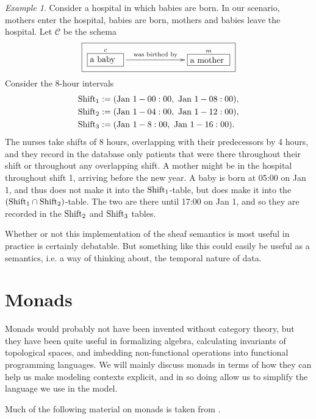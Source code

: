 \documentclass{book}
\def\tn{\textnormal}
\def\mc{\mathcal}
\newcommand{\LA}[2]{\ar[#1]^-{\tn {#2}}}
\newcommand{\obox}[3]{\stackrel{#1}{\fbox{\parbox{#2}{#3}}}}
\def\mcC{\mc{C}}
\theoremstyle{remark}
\newtheorem{example}[subsubsection]{Example}
\theoremstyle{definition}
\begin{document}
\begin{example}

Consider a hospital in which babies are born. In our scenario, mothers enter the hospital, babies are born, mothers and babies leave the hospital. Let $\mcC$ be the schema 
$$\fbox{\xymatrix{\obox{c}{.5in}{a baby}\LA{rr}{was birthed by}&\hspace{.2in}&\obox{m}{.6in}{a mother}}}$$
Consider the 8-hour intervals 
\begin{align*}
\tn{Shift}_1&:=(\tn{Jan }1 - 00:00,\tn{ Jan }1 - 08:00),\\
\tn{Shift}_2&:=(\tn{Jan }1 - 04:00,\tn{ Jan }1 - 12:00),\\
\tn{Shift}_3&:=(\tn{Jan }1 - 8:00,\tn{ Jan }1 - 16:00).
\end{align*}
The nurses take shifts of 8 hours, overlapping with their predecessors by 4 hours, and they record in the database only patients that were there throughout their shift or throughout any overlapping shift. A mother might be in the hospital throughout shift 1, arriving before the new year. A baby is born at 05:00 on Jan 1, and thus does not make it into the $\tn{Shift}_1$-table, but does make it into the $(\tn{Shift}_1\cap\tn{Shift}_2)$-table. The two are there until 17:00 on Jan 1, and so they are recorded in the $\tn{Shift}_2$ and $\tn{Shift}_3$ tables. 

\end{example}

Whether or not this implementation of the sheaf semantics is most useful in practice is certainly debatable. But something like this could easily be useful as a semantics, i.e. a way of thinking about, the temporal nature of data.


\section{Monads}\label{sec:monads}

Monads would probably not have been invented without category theory, but they have been quite useful in formalizing algebra, calculating invariants of topological spaces, and imbedding non-functional operations into functional programming languages. We will mainly discuss monads in terms of how they can help us make modeling contexts explicit, and in so doing allow us to simplify the language we use in the model.

Much of the following material on monads is taken from \cite{Sp3}.
\end{document}
